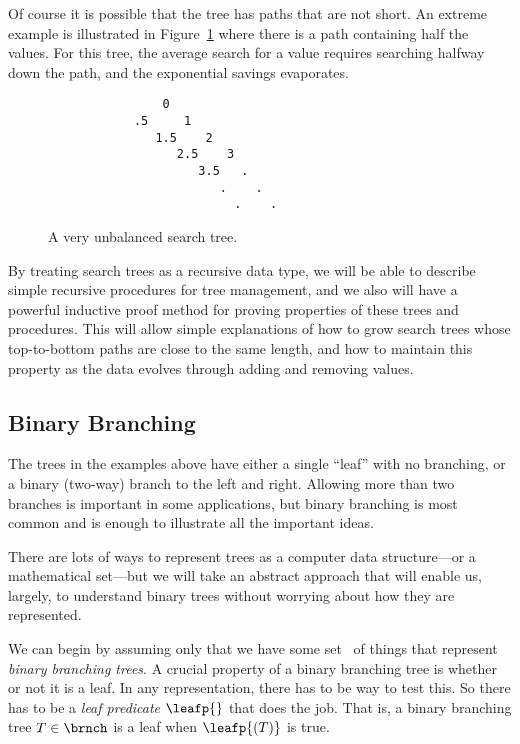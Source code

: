 \begin{definition}
Of course it is possible that the tree has paths that are not short.
An extreme example is illustrated in Figure~\ref{unbalanced} where
there is a path containing half the values.  For this tree, the
average search for a value requires searching halfway down the path,
and the exponential savings evaporates.

\begin{figure}

\begin{center}
\begin{verbatim}
                0
            .5     1
               1.5    2
                  2.5    3
                     3.5   .
                        .    .
                          .    .
\end{verbatim}   
\end{center}

\caption{A very unbalanced search tree.}

\label{unbalanced}

\end{figure}

By treating search trees as a recursive data type, we will be able to
describe simple recursive procedures for tree management, and we also
will have a powerful inductive proof method for proving properties of
these trees and procedures.  This will allow simple explanations of
how to grow search trees whose top-to-bottom paths are close to the
same length, and how to maintain this property as the data evolves
through adding and removing values.

\subsection{Binary Branching}

The trees in the examples above have either a single ``leaf'' with no
branching, or a binary (two-way) branch to the left and right.
Allowing more than two branches is important in some applications, but
binary branching is most common and is enough to illustrate all the
important ideas.

There are lots of ways to represent trees as a computer data
structure---or a mathematical set---but we will take an abstract
approach that will enable us, largely, to understand binary trees
without worrying about how they are represented.

We can begin by assuming only that we have some set \brnch\ of things
that represent \emph{binary branching trees}.  A crucial property of a
binary branching tree is whether or not it is a leaf.  In any
representation, there has to be way to test this.  So there has to be
a \emph{leaf predicate} $\leafp{}$ that does the job.  That is, a
binary branching tree $T \in \brnch$ is a leaf when $\leafp{(T)}$ is
true.


\end{definition}
